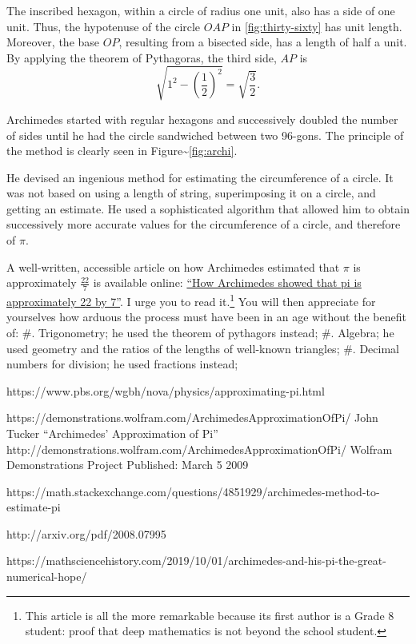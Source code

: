 \documentclass[
  a4paper,
]{article}
\begin{document}
The inscribed hexagon, within a circle of radius one unit, also has a
side of one unit. Thus, the hypotenuse of the circle \(OAP\) in
\cref{fig:thirty-sixty} has unit length. Moreover, the base \(OP\),
resulting from a bisected side, has a length of half a unit. By applying
the theorem of Pythagoras, the third side, \(AP\) is \[
\sqrt{1^2 - \left(\frac{1}{2}\right)^2} = \sqrt{\frac{3}{2}}.
\]

Archimedes started with regular hexagons and successively doubled the
number of sides until he had the circle sandwiched between two 96-gons.
The principle of the method is clearly seen in
Figure\textasciitilde{}\ref{fig:archi}.

He devised an ingenious method for estimating the circumference of a
circle. It was not based on using a length of string, superimposing it
on a circle, and getting an estimate. He used a sophisticated algorithm
that allowed him to obtain successively more accurate values for the
circumference of a circle, and therefore of \(\pi\).

A well-written, accessible article on how Archimedes estimated that
\(\pi\) is approximately \(\frac{22}{7}\) is available online:
\href{https://publications.azimpremjiuniversity.edu.in/3356/1/02-DaminiAndAbhishek_PiIs22By7_Final.pdf}{``How
Archimedes showed that pi is approximately 22 by 7''}. I urge you to
read it.\footnote{This article is all the more remarkable because its
  first author is a Grade 8 student: proof that deep mathematics is not
  beyond the school student.} You will then appreciate for yourselves
how arduous the process must have been in an age without the benefit of:
\#. Trigonometry; he used the theorem of pythagors instead; \#. Algebra;
he used geometry and the ratios of the lengths of well-known triangles;
\#. Decimal numbers for division; he used fractions instead;

https://www.pbs.org/wgbh/nova/physics/approximating-pi.html

https://demonstrations.wolfram.com/ArchimedesApproximationOfPi/ John
Tucker ``Archimedes' Approximation of Pi''
http://demonstrations.wolfram.com/ArchimedesApproximationOfPi/ Wolfram
Demonstrations Project Published: March 5 2009

https://math.stackexchange.com/questions/4851929/archimedes-method-to-estimate-pi

http://arxiv.org/pdf/2008.07995

https://mathsciencehistory.com/2019/10/01/archimedes-and-his-pi-the-great-numerical-hope/
\end{document}
